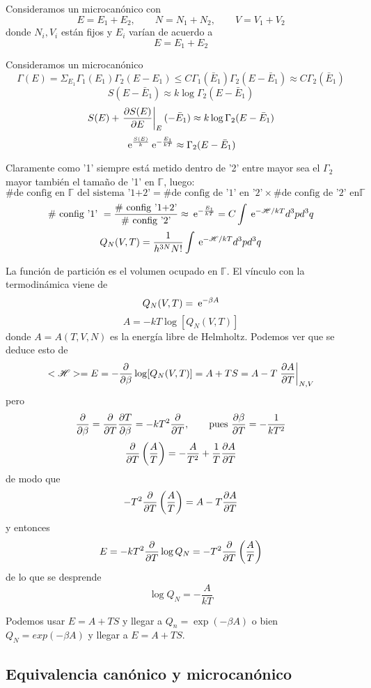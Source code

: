 \documentclass[10pt,oneside]{CBFT_book}
\begin{document}
Consideramos un microcanónico con 
\[
	E = E_1 + E_2, \qquad N = N_1 + N_2, \qquad V = V_1 + V_2 
\]
donde $N_i, V_i$ están fijos y $E_i$ varían de acuerdo a
\[
	E = E_1 + E_2
\]

Consideramos un microcanónico 
\[
	\Gamma(E) = \Sigma_{E_1} \Gamma_1(E_1) \Gamma_2(E-E_1) \leq C \Gamma_1(\bar{E}_1) \Gamma_2(E-\bar{E}_1)
	\approx C \Gamma_2(\bar{E}_1)
\]
\[
	S(E-\bar{E}_1) \approx k \log \Gamma_2(E-\bar{E}_1)
\]
\[
	S(E) + \left.\frac{\partial^{\hspace{-0.05em}} {S(E)}}{\partial {E}^{\hspace{-0.05em}}}\right|_E(-\bar{E}_1) \approx k \log \Gamma_2(E-\bar{E}_1)
\]
\[
	\:\mathrm{e}^{\frac{S(E)}{k}} \:\mathrm{e}^{-\frac{E_1}{kT}} \approx \Gamma_2(E-\bar{E}_1)
\]

Claramente como '1' siempre está metido dentro de '2' entre mayor sea el $\Gamma_2$ mayor también el tamaño de '1'
en $\mathbb{\Gamma}$, luego:
\[
	\# \text{de config en } \mathbb{\Gamma} \text{ del sistema '1+2'} = \# \text{de config de '1' en '2'} \times 
	\# \text{de config de '2' en} \mathbb{\Gamma}
\]
\[
	\# \text{ config '1' } = \frac{ \# \text{ config '1+2'} }{ \# \text{ config '2'} } \approx 
	\:\mathrm{e}^{-\frac{E_1}{kT}} = C \int \:\mathrm{e}^{-\mathscr{H}/kT} d^3p d^3q
\]
\[
	Q_N(V,T) = \frac{1}{h^{3N}N!}\int \:\mathrm{e}^{-\mathscr{H}/kT} d^3p d^3q
\]

La función de partición es el volumen ocupado en $\mathbb{\Gamma}$.
El vínculo con la termodinámica viene de
\[
	Q_N(V,T) = \:\mathrm{e}^{-\beta A}
\]
\[
	A = -kT\log [Q_N(V,T)]
\]
donde $A=A(T,V,N)$ es la energía libre de Helmholtz. Podemos ver que se deduce esto de 
\[
	< \mathscr{H} > = E = -\frac{\partial^{\hspace{-0.05em}} {}}{\partial {\beta}^{\hspace{-0.05em}}} \log [ Q_N(V,T) ] = A + TS = A - T\left.\frac{\partial^{\hspace{-0.05em}} {A}}{\partial {T}^{\hspace{-0.05em}}}\right|_{N,V}
\]
pero 
\[
	\frac{\partial^{\hspace{-0.05em}} {}}{\partial {\beta}^{\hspace{-0.05em}}} = \frac{\partial^{\hspace{-0.05em}} {}}{\partial {T}^{\hspace{-0.05em}}} \frac{\partial^{\hspace{-0.05em}} {T}}{\partial {\beta}^{\hspace{-0.05em}}} = -k T^2 \frac{\partial^{\hspace{-0.05em}} {}}{\partial {T}^{\hspace{-0.05em}}}, \qquad \text{pues } \frac{\partial^{\hspace{-0.05em}} {\beta}}{\partial {T}^{\hspace{-0.05em}}} = - 
	\frac{1}{kT^2}
\]
\[
	\frac{\partial^{\hspace{-0.05em}} {}}{\partial {T}^{\hspace{-0.05em}}}\left( \frac{A}{T} \right) = -\frac{A}{T^2} + \frac{1}{T}\frac{\partial^{\hspace{-0.05em}} {A}}{\partial {T}^{\hspace{-0.05em}}}
\]
de modo que 
\[
	-T^2 \frac{\partial^{\hspace{-0.05em}} {}}{\partial {T}^{\hspace{-0.05em}}}\left( \frac{A}{T} \right) = A - T \frac{\partial^{\hspace{-0.05em}} {A}}{\partial {T}^{\hspace{-0.05em}}}
\]
y entonces
\[
	E = -k T^2 \frac{\partial^{\hspace{-0.05em}} {}}{\partial {T}^{\hspace{-0.05em}}}\log Q_N = -T^2 \frac{\partial^{\hspace{-0.05em}} {}}{\partial {T}^{\hspace{-0.05em}}}\left( \frac{A}{T} \right) 
\]
de lo que se desprende
\[
	\log Q_N = -\frac{A}{kT}
\]

Podemos usar $E=A+TS$ y llegar a $Q_n=\exp(-\beta A)$ o bien $Q_N=exp(-\beta A)$ y llegar a $E=A+TS$.

\subsection{Equivalencia canónico y microcanónico}
\end{document}
